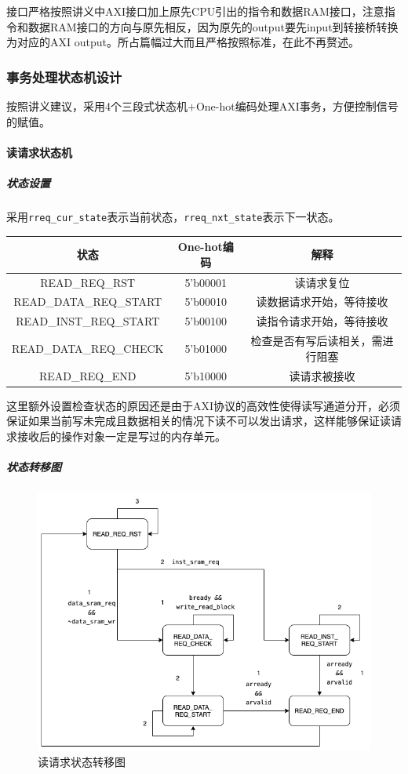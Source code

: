 \documentclass[UTF-8,twoside,c5size]{ctexart}
\begin{document}
	接口严格按照讲义中AXI接口加上原先CPU引出的指令和数据RAM接口，注意指令和数据RAM接口的方向与原先相反，因为原先的output要先input到转接桥转换为对应的AXI output。所占篇幅过大而且严格按照标准，在此不再赘述。

	\subsubsection{事务处理状态机设计}
	
	按照讲义建议，采用4个三段式状态机$+$One-hot编码处理AXI事务，方便控制信号的赋值。

	\paragraph{读请求状态机}\hfill
	
	\subparagraph{状态设置}\hfill
	
	采用\texttt{rreq_cur_state}表示当前状态，\texttt{rreq_nxt_state}表示下一状态。
	
	\begin{center}
	\begin{tabular}{|c|c|c|}
	\hline
  	\textbf{状态} & \textbf{One-hot编码} & \textbf{解释} \\
  	\hline
	READ_REQ_RST & 5'b00001 & 读请求复位 \\
	\hline
	READ_DATA_REQ_START & 5'b00010 & 读数据请求开始，等待接收 \\
	\hline
	READ_INST_REQ_START & 5'b00100 & 读指令请求开始，等待接收 \\
	\hline
	READ_DATA_REQ_CHECK & 5'b01000 & 检查是否有写后读相关，需进行阻塞 \\
	\hline
	READ_REQ_END & 5'b10000 & 读请求被接收 \\
	\hline
	\end{tabular}
	\end{center}
	
	这里额外设置检查状态的原因还是由于AXI协议的高效性使得读写通道分开，必须保证如果当前写未完成且数据相关的情况下读不可以发出请求，这样能够保证读请求接收后的操作对象一定是写过的内存单元。
	
	\subparagraph{状态转移图}\hfill
	
	\begin{figure}[h]
		\centering
		\includegraphics[width=0.6\linewidth]{figures/RREQ.png}
		\caption[rreq_status]{读请求状态转移图}
		\label{fig:rreq_status}
	\end{figure}
	
\end{document}
